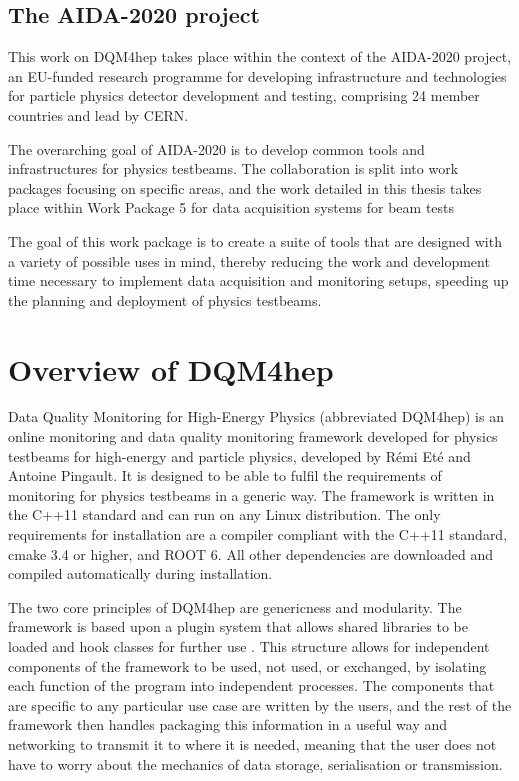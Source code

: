 \subsection*{The AIDA-2020 project}
This work on \acrshort{DQM4hep} takes place within the context of the AIDA-2020 project, an EU-funded research programme for developing infrastructure and technologies for particle physics detector development and testing, comprising 24 member countries and lead by \acrshort{CERN}.

The overarching goal of AIDA-2020 is to develop common tools and infrastructures for physics testbeams. The collaboration is split into work packages focusing on specific areas, and the work detailed in this thesis takes place within Work Package 5 for data acquisition systems for beam tests %

The goal of this work package is to create a suite of tools that are designed with a variety of possible uses in mind, thereby reducing the work and development time necessary to implement data acquisition and monitoring setups, speeding up the planning and deployment of physics testbeams. 

\section{Overview of DQM4hep}
Data Quality Monitoring for High-Energy Physics (abbreviated \acrshort{DQM4hep}) is an online monitoring and data quality monitoring framework developed for physics testbeams for high-energy and particle physics, developed by R\'{e}mi Et\'{e} and Antoine Pingault. It is designed to be able to fulfil the requirements of monitoring for physics testbeams in a generic way. The framework is written in the C++11 standard and can run on any Linux distribution. The only requirements for installation are a compiler compliant with the C++11 standard, cmake 3.4 or higher, and ROOT 6. All other dependencies are downloaded and compiled automatically during installation. 

The two core principles of \acrshort{DQM4hep} are genericness and modularity. The framework is based upon a plugin system that allows shared libraries to be loaded and hook classes for further use \cite{aida2020-milestone-dqm4hep}. This structure allows for independent components of the framework to be used, not used, or exchanged, by isolating each function of the program into independent processes. The components that are specific to any particular use case are written by the users, and the rest of the framework then handles packaging this information in a useful way and networking to transmit it to where it is needed, meaning that the user does not have to worry about the mechanics of data storage, serialisation or transmission. 

